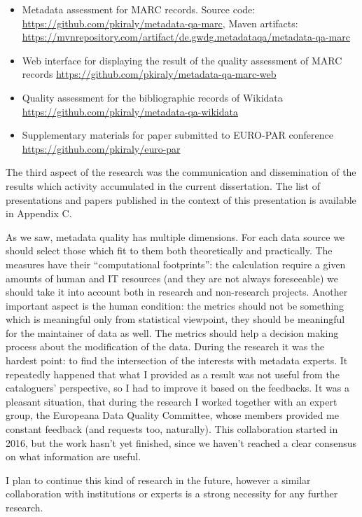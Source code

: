\begin{itemize}
\item Metadata assessment for MARC records. Source code: \url{https://github.com/pkiraly/metadata-qa-marc}, Maven artifacts: \url{https://mvnrepository.com/artifact/de.gwdg.metadataqa/metadata-qa-marc} 
\item Web interface for displaying the result of the quality assessment of MARC records \url{https://github.com/pkiraly/metadata-qa-marc-web}
\item Quality assessment for the bibliographic records of Wikidata \url{https://github.com/pkiraly/metadata-qa-wikidata}
\item Supplementary materials for paper submitted to EURO-PAR conference \url{https://github.com/pkiraly/euro-par}
\end{itemize}

The third aspect of the research was the communication and  dissemination of the results which activity accumulated in the current dissertation. The list of presentations and papers published in the context of this presentation is available in Appendix C.

As we saw, metadata quality has multiple dimensions. For each data source we should select those which fit to them both theoretically and practically. The measures have their ``computational footprints'': the calculation require a given amounts of human and IT resources (and they are not always foreseeable) we should take it into account both in research and non-research projects. Another important aspect is the human condition: the metrics should not be something which is meaningful only from statistical viewpoint, they should be meaningful for the maintainer of data as well. The metrics should help a decision making process about the modification of the data. During the research it was the hardest point: to find the intersection of the interests with metadata experts. It repeatedly happened that what I provided as a result was not useful from the cataloguers' perspective, so I had to improve it based on the feedbacks. It was a pleasant situation, that during the research I worked together with an expert group, the Europeana Data Quality Committee, whose members provided me constant feedback (and requests too, naturally). This collaboration started in 2016, but the work hasn't yet finished, since we haven't reached a clear consensus on what information are useful.

I plan to continue this kind of research in the future, however a similar collaboration with institutions or experts is a strong necessity for any further research.

